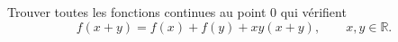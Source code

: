 Trouver toutes les fonctions continues au point $0$ qui vérifient
\[ f(x + y) = f(x) + f(y) + xy(x + y),\qquad x, y \in \mathbb{R}. \]
